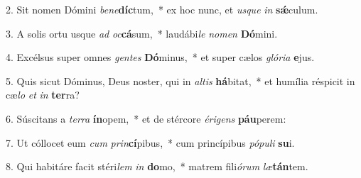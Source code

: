 2. Sit nomen Dómini \textit{be}\textit{ne}\textbf{díc}tum,~*  ex hoc nunc, et \textit{us}\textit{que} \textit{in} \textbf{sǽ}culum.\

3. A solis ortu usque \textit{ad} \textit{oc}\textbf{cá}sum,~*  laudábi\textit{le} \textit{no}\textit{men} \textbf{Dó}mini.\

4. Excélsus super omnes \textit{gen}\textit{tes} \textbf{Dó}minus,~*  et super cælos \textit{gló}\textit{ri}\textit{a} \textbf{e}jus.\

5. Quis sicut Dóminus, Deus noster, qui in \textit{al}\textit{tis} \textbf{há}bitat,~*  et humília réspicit in cæ\textit{lo} \textit{et} \textit{in} \textbf{ter}ra?\

6. Súscitans a \textit{ter}\textit{ra} \textbf{ín}opem,~*  et de stércore \textit{é}\textit{ri}\textit{gens} \textbf{páu}perem:\

7. Ut cóllocet eum \textit{cum} \textit{prin}\textbf{cí}pibus,~*  cum princípibus \textit{pó}\textit{pu}\textit{li} \textbf{su}i.\

8. Qui habitáre facit stéri\textit{lem} \textit{in} \textbf{do}mo,~*  matrem fili\textit{ó}\textit{rum} \textit{læ}\textbf{tán}tem.\

